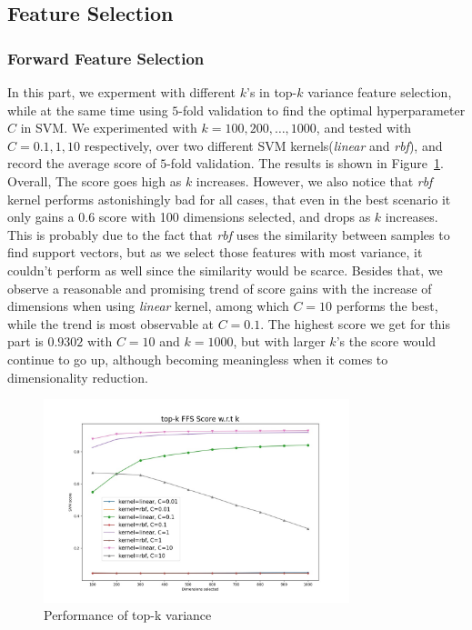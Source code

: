 \documentclass[journal]{IEEEtran}
\begin{document}
\subsection{Feature Selection}
\subsubsection{Forward Feature Selection}
In this part, we experment with different $k$'s in top-$k$ variance feature selection, while at the same time using $5$-fold validation to find the optimal hyperparameter $C$ in SVM. We experimented with $k=100, 200, \ldots, 1000$, and tested with $C = 0.1, 1, 10$ respectively, over two different SVM kernels(\emph{linear} and \emph{rbf}), and record the average score of $5$-fold validation. The results is shown in Figure~\ref{fig:2}. Overall, The score goes high as $k$ increases. However, we also notice that \emph{rbf} kernel performs astonishingly bad for all cases, that even in the best scenario it only gains a 0.6 score with 100 dimensions selected, and drops as $k$ increases. This is probably due to the fact that \emph{rbf} uses the similarity between samples to find support vectors, but as we select those features with most variance, it couldn't perform as well since the similarity would be scarce. Besides that, we observe a reasonable and promising trend of score gains with the increase of dimensions when using \emph{linear} kernel, among which $C=10$ performs the best, while the trend is most observable at $C=0.1$. The highest score we get for this part is $0.9302$ with $C=10$ and $k=1000$, but with larger $k$'s the score would continue to go up, although becoming meaningless when it comes to dimensionality reduction.
\begin{figure}[htpb]
  \centering
  \includegraphics[width=3.5in]{figures/selection/ffs_result.jpg}
  \caption{Performance of top-k variance}
  \label{fig:2}
  \vspace{-3mm}
\end{figure}
\end{document}
